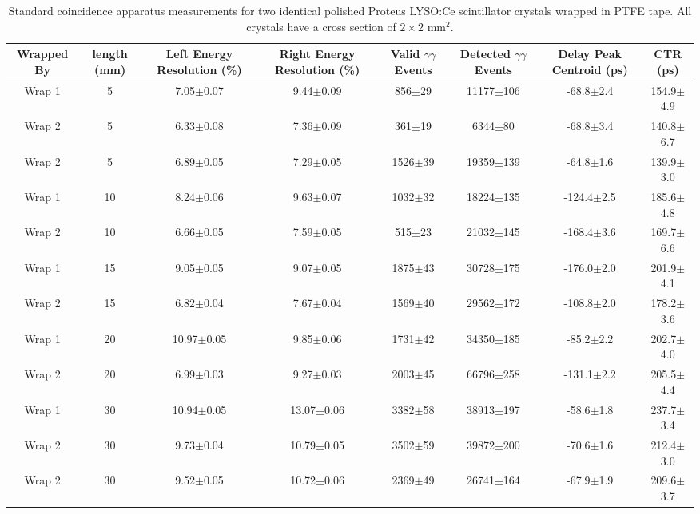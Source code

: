 \begin{table}
\caption{\label{tab:standardctr} Standard coincidence apparatus measurements for two identical polished Proteus LYSO:Ce scintillator crystals wrapped in PTFE tape. All crystals have a cross section of $2\times2$ mm$^2$.}
\begin{tabular}{cccccccc}
\hline
Wrapped By &  length (mm) & Left Energy Resolution (\%) & Right Energy Resolution (\%) &Valid $\gamma\gamma$ Events & Detected $\gamma\gamma$ Events & Delay Peak Centroid (ps) & CTR (ps)\\
\hline
    Wrap 1 &      5 &   7.05$\pm$0.07 &   9.44$\pm$0.09 &   856$\pm$29 &  11177$\pm$106 &   -68.8$\pm$2.4 &  154.9$\pm$4.9 \\
    Wrap 2 &      5 &   6.33$\pm$0.08 &   7.36$\pm$0.09 &   361$\pm$19 &    6344$\pm$80 &   -68.8$\pm$3.4 &  140.8$\pm$6.7 \\
    Wrap 2 &      5 &   6.89$\pm$0.05 &   7.29$\pm$0.05 &  1526$\pm$39 &  19359$\pm$139 &   -64.8$\pm$1.6 &  139.9$\pm$3.0 \\
    Wrap 1 &     10 &   8.24$\pm$0.06 &   9.63$\pm$0.07 &  1032$\pm$32 &  18224$\pm$135 &  -124.4$\pm$2.5 &  185.6$\pm$4.8 \\
    Wrap 2 &     10 &   6.66$\pm$0.05 &   7.59$\pm$0.05 &   515$\pm$23 &  21032$\pm$145 &  -168.4$\pm$3.6 &  169.7$\pm$6.6 \\
    Wrap 1 &     15 &   9.05$\pm$0.05 &   9.07$\pm$0.05 &  1875$\pm$43 &  30728$\pm$175 &  -176.0$\pm$2.0 &  201.9$\pm$4.1 \\
    Wrap 2 &     15 &   6.82$\pm$0.04 &   7.67$\pm$0.04 &  1569$\pm$40 &  29562$\pm$172 &  -108.8$\pm$2.0 &  178.2$\pm$3.6 \\
    Wrap 1 &     20 &  10.97$\pm$0.05 &   9.85$\pm$0.06 &  1731$\pm$42 &  34350$\pm$185 &   -85.2$\pm$2.2 &  202.7$\pm$4.0 \\
    Wrap 2 &     20 &   6.99$\pm$0.03 &   9.27$\pm$0.03 &  2003$\pm$45 &  66796$\pm$258 &  -131.1$\pm$2.2 &  205.5$\pm$4.4 \\
    Wrap 1 &     30 &  10.94$\pm$0.05 &  13.07$\pm$0.06 &  3382$\pm$58 &  38913$\pm$197 &   -58.6$\pm$1.8 &  237.7$\pm$3.4 \\
    Wrap 2 &     30 &   9.73$\pm$0.04 &  10.79$\pm$0.05 &  3502$\pm$59 &  39872$\pm$200 &   -70.6$\pm$1.6 &  212.4$\pm$3.0 \\
    Wrap 2 &     30 &   9.52$\pm$0.05 &  10.72$\pm$0.06 &  2369$\pm$49 &  26741$\pm$164 &   -67.9$\pm$1.9 &  209.6$\pm$3.7 \\
\hline
\end{tabular}
\end{table}

